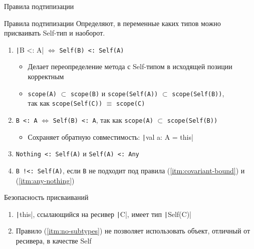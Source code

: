 \documentclass[aspectratio=169,usenames,dvipsnames]{beamer}
\begin{document}
    \begin{frame}[fragile]{Правила подтипизации}
        \begin{block}{Правила подтипизации}
            Определяют, в переменные каких типов можно присваивать Self-тип и наоборот.
            \begin{enumerate}
                \item \label{itm:covariant-bound} \texttt|B <: A| $\iff$ \texttt{Self(B) <: Self(A)}
                \begin{itemize}
                    \item Делает переопределение метода с Self-типом в исходящей позиции корректным
                    \item \texttt{scope(A)} $\subset$ \texttt{scope(B)} и \texttt{scope(Self(A))} $\subset$ \texttt{scope(Self(B))},\\ так как \texttt{scope(Self(C))} $\equiv$ \texttt{scope(C)} \pause
                \end{itemize}
                \item \label{itm:this-subtype} \texttt{B <: A} $\iff$ \texttt{Self(B) <: A}, так как \texttt{scope(A)} $\subset$ \texttt{scope(Self(B))}
                \begin{itemize}
                    \item Сохраняет обратную совместимость: \texttt|val a: A = this|
                \end{itemize} \pause
                \item \label{itm:any-nothing} \texttt{Nothing <: Self(A)} и \texttt{Self(A) <: Any} \pause
                \item \label{itm:no-subtypes} \texttt{B  !<: Self(A)}, если \texttt{B} не подходит под правила (\ref{itm:covariant-bound}) и (\ref{itm:any-nothing})
            \end{enumerate}
        \end{block}
        \pause
        \begin{block}{Безопасность присваиваний}
            \begin{enumerate}
                \item \texttt|this|, ссылающийся на ресивер \texttt|C|, имеет тип \texttt|Self(C)|
                \item Правило (\ref{itm:no-subtypes}) не позволяет использовать объект, отличный от ресивера, в качестве Self
            \end{enumerate}
        \end{block}
    \end{frame}
\end{document}
